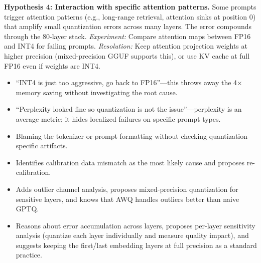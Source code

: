 \begin{interviewq}
\textbf{Hypothesis 4: Interaction with specific attention patterns.} Some prompts trigger attention patterns (e.g., long-range retrieval, attention sinks at position 0) that amplify small quantization errors across many layers. The error compounds through the 80-layer stack. \textit{Experiment:} Compare attention maps between FP16 and INT4 for failing prompts. \textit{Resolution:} Keep attention projection weights at higher precision (mixed-precision GGUF supports this), or use KV cache at full FP16 even if weights are INT4.

\redflags
\begin{itemize}
    \item ``INT4 is just too aggressive, go back to FP16''---this throws away the 4$\times$ memory saving without investigating the root cause.
    \item ``Perplexity looked fine so quantization is not the issue''---perplexity is an average metric; it hides localized failures on specific prompt types.
    \item Blaming the tokenizer or prompt formatting without checking quantization-specific artifacts.
\end{itemize}


\goodgreat
\begin{itemize}
    \item {} Identifies calibration data mismatch as the most likely cause and proposes re-calibration.
    \item {} Adds outlier channel analysis, proposes mixed-precision quantization for sensitive layers, and knows that AWQ handles outliers better than naive GPTQ.
    \item {} Reasons about error accumulation across layers, proposes per-layer sensitivity analysis (quantize each layer individually and measure quality impact), and suggests keeping the first/last embedding layers at full precision as a standard practice.
\end{itemize}

\end{interviewq}

